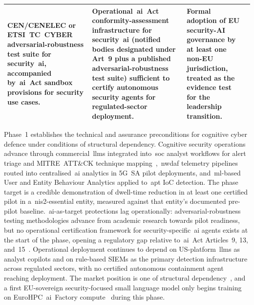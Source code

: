 \documentclass{ieeeaccess}
\begin{document}
\begin{table}[t]
\begin{tabularx}{\textwidth}{@{}>{\bfseries}p{} X X X@{}}
CEN/CENELEC or ETSI~TC~CYBER adversarial-robustness test suite for security~\gls{ai}, accompanied by~\gls{ai}~Act sandbox provisions for security use cases. &
Operational~\gls{ai}~Act conformity-assessment infrastructure for security~\gls{ai} (notified bodies designated under Art~9 plus a published adversarial-robustness test suite) sufficient to certify autonomous security agents for regulated-sector deployment. &
Formal adoption of EU security-AI governance by at least one non-EU jurisdiction, treated as the evidence test for the leadership transition. \\
\bottomrule
\end{tabularx}
\end{table}

Phase~1 establishes the technical and assurance preconditions for cognitive cyber defence under conditions of structural dependency. Cognitive security operations advance through commercial~\glspl{llm} integrated into~\gls{soc} analyst workflows for alert triage and MITRE~ATT\&CK technique mapping~\cite{mitre2020},~\gls{nwdaf} telemetry pipelines~\cite{tgpp23288} routed into centralised~\gls{ai} analytics in 5G~SA pilot deployments, and~\gls{ml}-based User and Entity Behaviour Analytics applied to~\gls{apt} IoC detection. The phase target is a credible demonstration of dwell-time reduction in at least one certified pilot in a~\gls{nis2}-essential entity, measured against that entity's documented pre-pilot baseline.~\gls{ai}-as-target protections lag operationally: adversarial-robustness testing methodologies advance from academic research towards pilot readiness, but no operational certification framework for security-specific~\gls{ai} agents exists at the start of the phase, opening a regulatory gap relative to~\gls{ai}~Act Articles~9, 13, and~15~\cite{euaiact,ep2026aiact}. Operational deployment continues to depend on US-platform~\glspl{llm} as analyst copilots and on rule-based SIEMs as the primary detection infrastructure across regulated sectors, with no certified autonomous containment agent reaching deployment. The market position is one of structural dependency~\cite{gartner2025siem}, and a first EU-sovereign security-focused small language model only begins training on EuroHPC~\gls{ai}~Factory compute~\cite{eurohpcaifactories} during this phase.
\end{document}

